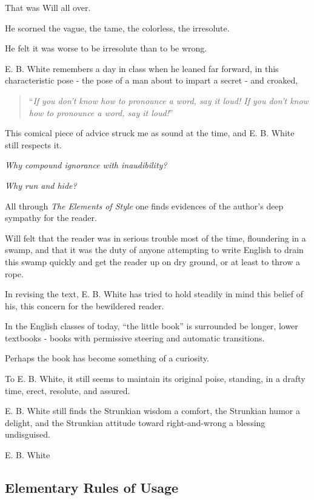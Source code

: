 \documentclass{article}
\begin{document}
That was Will all over.

He scorned the vague, the tame, the colorless, the irresolute.

He felt it was worse to be irresolute than to be wrong.

E. B. White remembers a day in class when he leaned far forward, in this characteristic pose - the pose of a man about to impart a secret - and croaked,
\begin{quotation}
	``{\it If you don't know how to pronounce a word, say it loud! If you don't know how to pronounce a word, say it loud!}''
\end{quotation}
This comical piece of advice struck me as sound at the time, and E. B. White still respects it.

{\it Why compound ignorance with inaudibility?}

{\it Why run and hide?}

%
All through {\it The Elements of Style} one finds evidences of the author's deep sympathy for the reader.

Will felt that the reader was in serious trouble most of the time, floundering in a swamp, and that it was the duty of anyone attempting to write English to drain this swamp quickly and get the reader up on dry ground, or at least to throw a rope.

In revising the text, E. B. White has tried to hold steadily in mind this belief of his, this concern for the bewildered reader.

%
In the English classes of today, ``the little book'' is surrounded be longer, lower textbooks - books with permissive steering and automatic transitions.

Perhaps the book has become something of a curiosity.

To E. B. White, it still seems to maintain its original poise, standing, in a drafty time, erect, resolute, and assured.

E. B. White still finds the Strunkian wisdom a comfort, the Strunkian humor a delight, and the Strunkian attitude toward right-and-wrong a blessing undisguised.

\begin{flushright}
	E. B. White
\end{flushright}


\subsection{Elementary Rules of Usage}
\end{document}
